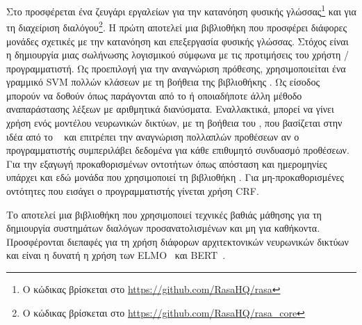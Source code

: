 Στο  προσφέρεται ένα ζευγάρι εργαλείων
για την κατανόηση φυσικής γλώσσας\footnote{Ο κώδικας βρίσκεται στο \url{https://github.com/RasaHQ/rasa}}
και για τη διαχείριση διαλόγου\footnote{Ο κώδικας βρίσκεται στο \url{https://github.com/RasaHQ/rasa_core}}.
Η πρώτη αποτελεί μια βιβλιοθήκη που προσφέρει διάφορες μονάδες σχετικές με την κατανόηση και επεξεργασία φυσικής γλώσσας.
Στόχος είναι η δημιουργία μιας σωλήνωσης λογισμικού σύμφωνα με τις προτιμήσεις του χρήστη / προγραμματιστή.
Ως προεπιλογή για την αναγνώριση πρόθεσης, χρησιμοποιείται ένα γραμμικό SVM πολλών κλάσεων με τη βοήθεια της βιβλιοθήκης .
Ως είσοδος μπορούν να δοθούν  όπως παράγονται από το  ή οποιαδήποτε άλλη μέθοδο αναπαράστασης λέξεων με αριθμητικά διανύσματα.
Εναλλακτικά, μπορεί να γίνει χρήση ενός μοντέλου νευρωνικών δικτύων, με τη βοήθεια του ,
που βασίζεται στην ιδέα από το ~\cite{wu2018starspace} και επιτρέπει την αναγνώριση πολλαπλών προθέσεων αν ο προγραμματιστής συμπεριλάβει δεδομένα για κάθε επιθυμητό συνδυασμό προθέσεων.
Για την εξαγωγή προκαθορισμένων οντοτήτων όπως απόσταση και ημερομηνίες υπάρχει και εδώ μονάδα που χρησιμοποιεί τη βιβλιοθήκη .
Για μη-προκαθορισμένες οντότητες που εισάγει ο προγραμματιστής γίνεται χρήση CRF.

Το  αποτελεί μια βιβλιοθήκη που χρησιμοποιεί τεχνικές βαθιάς μάθησης για τη δημιουργία συστημάτων διαλόγων προσανατολισμένων και μη για καθήκοντα.
Προσφέρονται διεπαφές για τη χρήση διάφορων αρχιτεκτονικών νευρωνικών δικτύων και είναι η δυνατή η χρήση των ELMO~\cite{elmo} και BERT~\cite{bert}.

